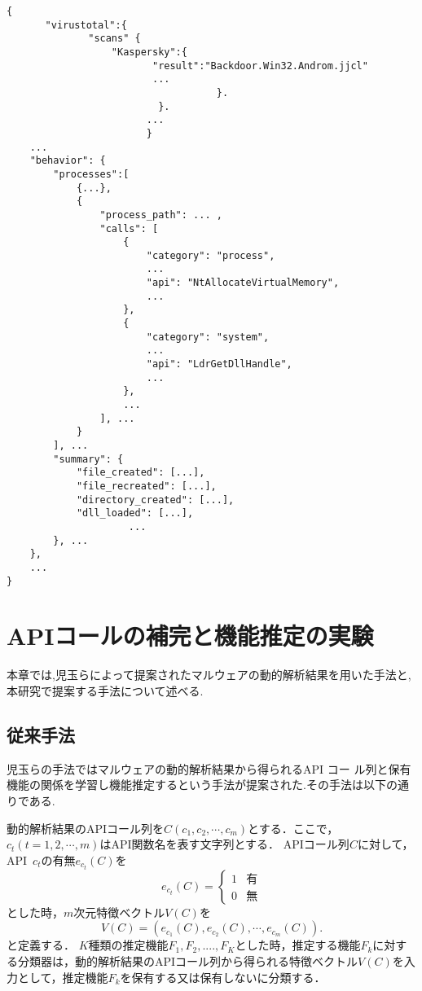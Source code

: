 \documentclass{thesis}
\begin{document}
\begin{lstlisting}[caption={jsonファイルの内容}, label={listing:json}]
{
　　　　"virustotal":{
              "scans" {
                  "Kaspersky":{
                         "result":"Backdoor.Win32.Androm.jjcl"
                         ...
                                    }.
                          }.
                        ...
                        }                        
	...
	"behavior": {
		"processes":[
			{...},
			{	
				"process_path": ... ,
				"calls": [
					{
						"category": "process",
						...
						"api": "NtAllocateVirtualMemory",
						...
					},
					{
						"category": "system",
						...
						"api": "LdrGetDllHandle",
						...
					},
					...
				], ...
			}
		], ...
		"summary": {
			"file_created": [...],
			"file_recreated": [...],
			"directory_created": [...],
			"dll_loaded": [...],
　　　　　　　　　　　　 ...
		}, ...
	}, 
	...
}
\end{lstlisting}











\chapter{APIコールの補完と機能推定の実験}
本章では,児玉らによって提案されたマルウェアの動的解析結果を用いた手法と,本研究で提案する手法について述べる.

\section{従来手法}
児玉らの手法ではマルウェアの動的解析結果から得られるAPI コー ル列と保有機能の関係を学習し機能推定するという手法が提案された.その手法は以下の通りである.


動的解析結果のAPIコール列を$C(c_1, c_2, \cdots, c_m)$とする．ここで，$c_t(t=1, 2, \cdots, m)$はAPI関数名を表す文字列とする．
APIコール列$C$に対して，API\ $c_t$の有無$e_{c_t}(C)$を
\[
	e_{c_t}(C) = \begin{cases}
		1 &有 \\
		0 & 無
	\end{cases}
\]
とした時，$m$次元特徴ベクトル$V(C)$を
\[
	V(C) = (e_{c_1}(C), e_{c_2}(C), \cdots, e_{c_m}(C)).
\]
と定義する．
$K$種類の推定機能$F_1, F_2, ...., F_K$とした時，推定する機能$F_k$に対する分類器は，動的解析結果のAPIコール列から得られる特徴ベクトル$V(C)$を入力として，推定機能$F_k$を保有する又は保有しないに分類する．
\end{document}

